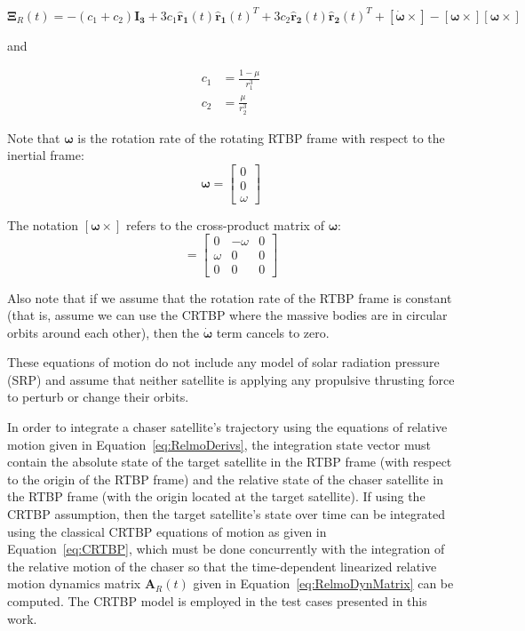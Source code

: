 \documentclass[letterpaper, preprint, paper,11pt]{AAS}	%
\begin{document}
\begin{equation*}
	\mathbf{\Xi}_R(t) = -(c_1 + c_2)\mathbf{I_3} 
	+ 3c_1\mathbf{\hat{r}_1}(t) \mathbf{\hat{r}_1}(t)^T 
	+ 3c_2\mathbf{\hat{r}_2}(t) \mathbf{\hat{r}_2}(t)^T 
	+ [\boldsymbol{\dot{\omega}} \times] 
	- [\boldsymbol{\omega}\times][\boldsymbol{\omega}\times]
\end{equation*}

and

\begin{equation*}
	\begin{aligned}
		c_1 &= \frac{1- \mu}{r_1^3} \\
		c_2 &= \frac{\mu}{r_2^3}
	\end{aligned}
\end{equation*}

Note that \(\boldsymbol{\omega}\) is the rotation rate of the rotating RTBP frame with respect to the inertial frame:
\begin{equation*}
	\boldsymbol{\omega} = \begin{bmatrix}
		0 \\ 
		0 \\
		\omega
	\end{bmatrix}
\end{equation*}

The notation  \([\boldsymbol{\omega}\times]\) refers to the cross-product matrix of \(\boldsymbol{\omega}\):
\begin{equation*}
	[\boldsymbol{\omega}\times] = \begin{bmatrix}
		0           & -\omega & 0 \\ 
		\omega & 0             & 0 \\
		0           & 0             & 0
	\end{bmatrix}
\end{equation*}

Also note that if we assume that the rotation rate of the RTBP frame is constant (that is, assume we can use the CRTBP where the massive bodies are in circular orbits around each other), then the \(\boldsymbol{\dot{\omega}}\) term cancels to zero.

These equations of motion do not include any model of solar radiation pressure (SRP) and assume that neither satellite is applying any propulsive thrusting force to perturb or change their orbits. 

In order to integrate a chaser satellite's trajectory using the equations of relative motion given in Equation~\eqref{eq:RelmoDerivs}, the integration state vector must contain the absolute state of the target satellite in the RTBP frame (with respect to the origin of the RTBP frame) and the relative state of the chaser satellite in the RTBP frame (with the origin located at the target satellite).  If using the CRTBP assumption, then the target satellite's state over time can be integrated using the classical CRTBP equations of motion as given in Equation~\eqref{eq:CRTBP}, which must be done concurrently with the integration of the relative motion of the chaser so that the time-dependent linearized relative motion dynamics matrix \(\mathbf{A}_R(t)\) given in Equation~\eqref{eq:RelmoDynMatrix} can be computed. The CRTBP model is employed in the test cases presented in this work.
\end{document}
